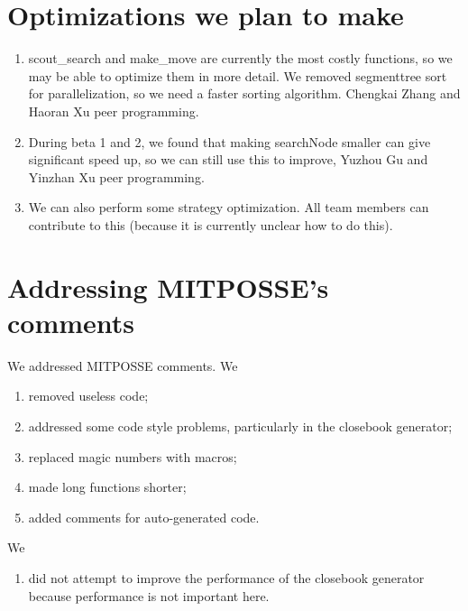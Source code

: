\documentclass[10pt,twosidep]{article}
\begin{document}
\section{Optimizations we plan to make}
\begin{enumerate}
  \item scout\_search and make\_move are currently the most costly functions, so we may be able to optimize them in more detail. We removed segmenttree sort for parallelization, so we need a faster sorting algorithm. Chengkai Zhang and Haoran Xu peer programming.
  \item During beta 1 and 2, we found that making searchNode smaller can give significant speed up, so we can still use this to improve, Yuzhou Gu and Yinzhan Xu peer programming.
  \item We can also perform some strategy optimization. All team members can contribute to this (because it is currently unclear how to do this).
\end{enumerate}

\section{Addressing MITPOSSE's comments}

We addressed MITPOSSE comments. We 
\begin{enumerate}
	\item removed useless code;
	\item addressed some code style problems, particularly in the closebook generator;
	\item replaced magic numbers with macros;
	\item made long functions shorter;
	\item added comments for auto-generated code.
\end{enumerate}

We
\begin{enumerate}
	\item did not attempt to improve the performance of the closebook generator because performance is not important here.
\end{enumerate}
\end{document}
